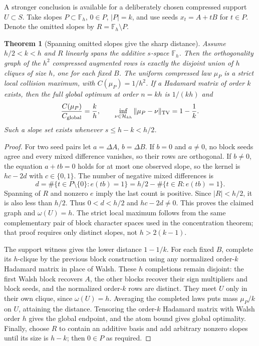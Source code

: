 \documentclass[11pt]{article}
\newtheorem{theorem}{Theorem}[section]
\begin{document}
A stronger conclusion is available for a deliberately chosen compressed
support $U\subset S$. Take slopes $P\subset\mathbb F_h$, $0\in P$,
$|P|=k$, and use seeds $x_t=A+tB$ for $t\in P$. Denote the omitted
slopes by $R=\mathbb F_h\setminus P$.
\begin{theorem}[Spanning omitted slopes give the sharp distance]
\label{thm:design-spanning-slopes}
Assume $h/2<k<h$ and $R$ linearly spans the additive $s$-space
$\mathbb F_h$. Then the orthogonality graph of the $h^2$ compressed
augmented rows is exactly the disjoint union of $h$ cliques of size $h$,
one for each fixed $B$.
The uniform compressed law $\mu_P$ is a strict local collision maximum,
with $C(\mu_P)=1/h^2$.
If a Hadamard matrix of order $k$ exists, then the full global optimum
at order $n=kh$ is $1/(kh)$ and
\[
 \frac{C(\mu_P)}{C_{\rm global}}=\frac{k}{h},\qquad
 \inf_{\nu\in\mathcal H_{kh}}\|\mu_P-\nu\|_{\rm TV}=1-\frac1k.
\]
Such a slope set exists whenever $s\le h-k<h/2$.
\end{theorem}
\begin{proof}
For two seed pairs let $a=\Delta A$, $b=\Delta B$.
If $b=0$ and $a\ne0$, no block seeds agree and every mixed difference
vanishes, so their rows are orthogonal. If $b\ne0$, the equation
$a+tb=0$ holds for at most one observed slope, so the kernel is
$h c-2d$ with $c\in\{0,1\}$. The number of negative mixed differences is
\[
 d=\#\{t\in P\setminus\{0\}:e(tb)=1\}
   =h/2-\#\{t\in R:e(tb)=1\}.
\]
Spanning of $R$ and nonzero $e$ imply the last count is positive.
Since $|R|<h/2$, it is also less than $h/2$. Thus $0<d<h/2$ and
$hc-2d\ne0$. This proves the claimed graph and $\omega(U)=h$.
The strict local maximum follows from the same complementary pair of
block character spaces used in the concentration theorem; that proof
requires only distinct slopes, not $h>2(k-1)$.

The support witness gives the lower distance $1-1/k$. For each fixed
$B$, complete its $h$-clique by the previous block construction using
any normalized order-$k$ Hadamard matrix in place of Walsh. These $h$
completions remain disjoint: the first Walsh block recovers $A$, the
other blocks recover their sign multipliers and block seeds, and the
normalized order-$k$ rows are distinct. They meet $U$ only in their
own clique, since $\omega(U)=h$. Averaging the completed laws puts
mass $\mu_P/k$ on $U$, attaining the distance. Tensoring the order-$k$
Hadamard matrix with Walsh order $h$ gives the global endpoint, and
the atom bound gives global optimality. Finally, choose $R$ to contain
an additive basis and add arbitrary nonzero slopes until its size is
$h-k$; then $0\in P$ as required.
\end{proof}
\end{document}
